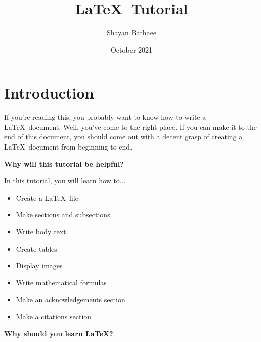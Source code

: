 \documentclass[12pt, journal, compsoc]{IEEEtran}
\title{\LaTeX\ Tutorial}
\author{Shayan Bathaee}
\date{October 2021}
\begin{document}


\maketitle

\section{Introduction}
If you're reading this, you probably want to know how to write a \LaTeX\ document. Well, you've come to the right place. If you can make it to the end of this document, you should come out with a decent grasp of creating a \LaTeX\ document from beginning to end.

\vspace{12pt}

\noindent \textbf{Why will this tutorial be helpful?}

\noindent In this tutorial, you will learn how to...
\begin{itemize}
    \item Create a \LaTeX\ file
    \item Make sections and subsections
    \item Write body text
    \item Create tables
    \item Display images
    \item Write mathematical formulas
    \item Make an acknowledgements section
    \item Make a citations section
\end{itemize}

\vspace{12pt}

\noindent \textbf{Why should you learn \LaTeX?}
\end{document}
